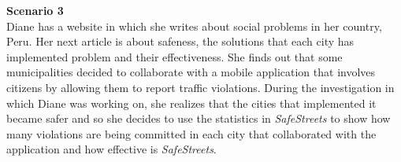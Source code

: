 \noindent\textbf{Scenario 3}\\
Diane has a website in which she writes about social problems in her country, Peru. Her next article is about safeness, the solutions that each city has implemented problem and their effectiveness. She finds out that some municipalities decided to collaborate with a mobile application that involves citizens by allowing them to report traffic violations. During the investigation in which Diane was working on, she realizes that the cities that implemented it became safer and so she decides to use the statistics in \textit{SafeStreets} to show how many violations are being committed in each city that collaborated with the application and how effective is \textit{SafeStreets}.



